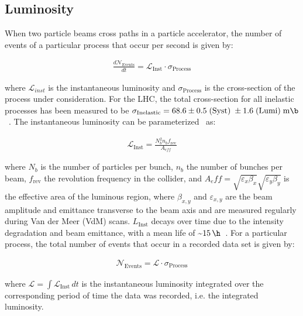 \subsection{Luminosity}
When two particle beams cross paths in a particle accelerator, the number of events of a particular process that occur per second is given by:
\begin{linenomath*}
\begin{align}
{\frac{d\mathcal{N}_{\text {Events}}}{dt}}= \mathcal{L}_{\text{Inst}} \cdot \sigma_{\text{Process}}
\end{align}
\end{linenomath*}
where $\mathcal{L}_{inst}$ is the instantaneous luminosity and $\sigma_{\text{Process}}$ is the cross-section of the process under consideration.
For the \beamenergy LHC, the total cross-section for all inelastic processes has been measured to be $\sigma_{\text{Inelastic}} = 68.6 \pm 0.5 \; (\text{Syst}) \; \pm 1.6 \; (\text{Lumi}) \; \si{\m \b}$~\cite{inelasticprotonprotoncrosssection}.
The instantaneous luminosity can be parameterized~\cite{Karacheban:2294183} as:
\begin{linenomath*}
\begin{align}
\mathcal{L}_{\text{Inst}}=\frac{N_b^2 n_b f_{\mathrm{rev}}}{A_{eff}}
\end{align}
\end{linenomath*}
where $N_b$ is the number of particles per bunch, $n_b$ the number of bunches per beam, $f_{\mathrm{rev}}$ the revolution frequency in the collider, and $A_eff = \sqrt{\varepsilon_x \beta_x} \sqrt{\varepsilon_y \beta_y}$ is the effective area of the luminous region, where $\beta_{x,y}$ and $\varepsilon_{x,y}$ are the beam amplitude and emittance transverse to the beam axis and are measured regularly during Van der Meer (VdM) scans.
$L_{\text{Inst}}$ decays over time due to the intensity degradation and beam emittance, with a mean life of \sim$\SI{15}{\h}$~\cite{LyndonEvans_2008}.
For a particular process, the total number of events that occur in a recorded data set is given by:
\begin{linenomath*}
\begin{align}
\mathcal{N}_{\text {Events}}= \mathcal{L} \cdot \sigma_{\text{Process}}
\end{align}
\end{linenomath*}
where $\mathcal{L} = \int \mathcal{L}_{\text{Inst}} \,dt$ is the instantaneous luminosity integrated over the corresponding period of time the data was recorded, i.e. the integrated luminosity.


